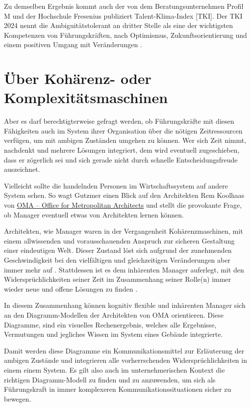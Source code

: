 \documentclass[
  ngerman,
  letterpaper,
  DIV=11]{scrartcl}
\begin{document}
Zu demselben Ergebnis kommt auch der von dem Beratungsunternehmen Profil
M und der Hochschule Fresenius publiziert Talent-Klima-Index {[}TKI{]}.
Der TKI 2024 nennt die Ambiguitätstolerant an dritter Stelle als eine
der wichtigsten Kompetenzen von Führungskräften, nach Optimismus,
Zukunftsorientierung und einem positiven Umgang mit Veränderungen
\autocite{stulle2024}.

\section{Über Kohärenz- oder
Komplexitätsmaschinen}\label{uxfcber-kohuxe4renz--oder-komplexituxe4tsmaschinen}

Aber es darf berechtigterweise gefragt werden, ob Führungskräfte mit
diesen Fähigkeiten auch im System ihrer Organisation über die nötigen
Zeitressourcen verfügen, um mit ambigen Zuständen umgehen zu können. Wer
sich Zeit nimmt, nachdenkt und mehrere Lösungen integriert, dem wird
eventuell zugeschieben, dass er zögerlich sei und sich gerade nicht
durch schnelle Entscheidungsfreude auszeichnet.

Vielleicht sollte die handelnden Personen im Wirtschaftssystem auf
andere System sehen. So wagt Gutzmer einen Blick auf den Architekten Rem
Koolhaas von \href{https://www.oma.com}{OMA -- Office for Metropolitan
Architects} und stellt die provokante Frage, ob Manager eventuell etwas
von Architekten lernen können.

Architekten, wie Manager waren in der Vergangenheit Kohärenzmaschinen,
mit einem allwissenden und vorausschauenden Anspruch zur sicheren
Gestaltung einer eindeutigen Welt. Dieser Zustand löst sich aufgrund der
zunehmenden Geschwindigkeit bei den vielfältigen und gleichzeitigen
Veränderungen aber immer mehr auf \autocite{roth2019}. Stattdessen ist
es dem inhärenten Manager auferlegt, mit den Widersprüchlichkeiten
seiner Zeit im Zusammenhang seiner Rolle(n) immer wieder neue und offene
Lösungen zu finden \autocite{gutzmer2020}.

In diesem Zusammenhang können kognitiv flexible und inhärenten Manager
sich an den Diagramm-Modellen der Architekten von OMA orientieren. Diese
Diagramme, sind ein visuelles Rechenergebnis, welches alle Ergebnisse,
Vermutungen und jegliches Wissen im System eines Gebäude integrierte.

Damit werden diese Diagramme ein Kommunikationsmittel zur Erläuterung
der ambigen Zustände und integrieren alle vorherrschenden
Widersprüchlichkeiten in einem einem System. Es gilt also auch im
unternehmerischen Kontext die richtigen Diagramm-Modell zu finden und zu
anzuwenden, um sich als Führungskraft in immer komplexeren
Kommunikationssituationen sicher zu bewegen.
\end{document}
